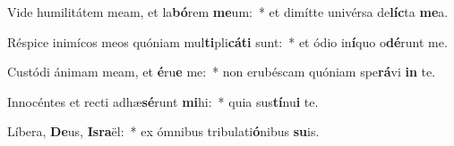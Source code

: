 \item Vide humilitátem meam, et la\textbf{bó}rem \textbf{me}um:~* et dimítte univérsa de\textbf{líc}ta \textbf{me}a.
\item Réspice inimícos meos quóniam mul\textbf{ti}pli\textbf{cá}\textbf{ti} sunt:~* et ódio in\textbf{í}quo o\textbf{dé}runt me.
\item Custódi ánimam meam, et \textbf{é}ru\textbf{e} me:~* non erubéscam quóniam spe\textbf{rá}vi \textbf{in} te.
\item Innocéntes et recti adhæ\textbf{sé}runt \textbf{mi}hi:~* quia sus\textbf{tí}nu\textbf{i} te.
\item Líbera, \textbf{De}us, \textbf{Is}\textbf{ra}ël:~* ex ómnibus tribulati\textbf{ó}nibus \textbf{su}is.
